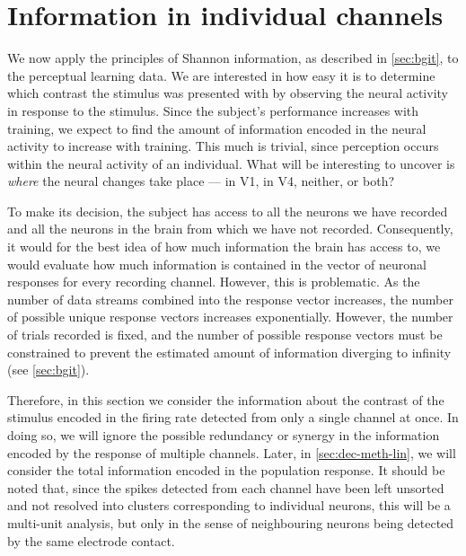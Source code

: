 \FloatBarrier
\section{Information in individual channels}

We now apply the principles of Shannon information, as described in \autoref{sec:bgit}, to the perceptual learning data.
We are interested in how easy it is to determine which contrast the stimulus was presented with by observing the neural activity in response to the stimulus.
Since the subject's performance increases with training, we expect to find the amount of information encoded in the neural activity to increase with training.
This much is trivial, since perception occurs within the neural activity of an individual.
What will be interesting to uncover is \textit{where} the neural changes take place --- in \ac{V1}, in \ac{V4}, neither, or both?

To make its decision, the subject has access to all the neurons we have recorded and all the neurons in the brain from which we have not recorded.
Consequently, it would for the best idea of how much information the brain has access to, we would evaluate how much information is contained in the vector of neuronal responses for every recording channel.
However, this is problematic.
As the number of data streams combined into the response vector increases, the number of possible unique response vectors increases exponentially.
However, the number of trials recorded is fixed, and the number of possible response vectors must be constrained to prevent the estimated amount of information diverging to infinity (see \autoref{sec:bgit}).

Therefore, in this section we consider the information about the contrast of the stimulus encoded in the firing rate detected from only a single channel at once.
In doing so, we will ignore the possible redundancy or synergy in the information encoded by the response of multiple channels.
Later, in \autoref{sec:dec-meth-lin}, we will consider the total information encoded in the population response.
It should be noted that, since the spikes detected from each channel have been left unsorted and not resolved into clusters corresponding to individual neurons, this will be a multi-unit analysis, but only in the sense of neighbouring neurons being detected by the same electrode contact.


